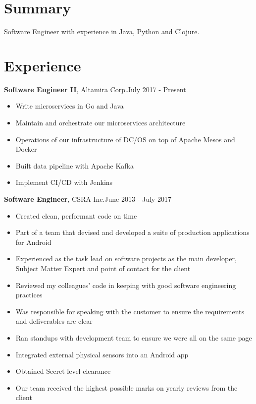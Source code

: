 \documentclass[line, margin, 10pt]{res} \setlength{\parskip}{9pt}
\begin{document}
\renewcommand{\namefont}{ \LARGE \bf }

 \address{chrispickard9@gmail.com} \address{pickard.cc}

\begin{resume}
  \section{Summary}
  Software Engineer with experience in Java, Python and Clojure.

  \section{Experience}


  {\bf Software Engineer II}, Altamira Corp.\hfill July 2017 - Present
  \begin{itemize} \itemsep -2pt %
  \item Write microservices in Go and Java
  \item Maintain and orchestrate our microservices architecture
  \item Operations of our infrastructure of DC/OS on top of Apache Mesos and Docker
  \item Built data pipeline with Apache Kafka
  \item Implement CI/CD with Jenkins
  \end{itemize}

  {\bf Software Engineer}, CSRA Inc.\hfill June 2013 - July 2017
  \begin{itemize} \itemsep -2pt %
  \item Created clean, performant code on time
  \item Part of a team that devised and developed a suite of production applications for Android
  \item Experienced as the task lead on software projects as the main developer,
    Subject Matter Expert and point of contact for the client
  \item Reviewed my colleagues' code in keeping with good software engineering practices
  \item Was responsible for speaking with the customer to ensure the requirements and deliverables are clear
  \item Ran standups with development team to ensure we were all on the same page
  \item Integrated external physical sensors into an Android app
  \item Obtained Secret level clearance
  \item Our team received the highest possible marks on yearly reviews from the client
  \end{itemize}



\end{resume}
\end{document}
